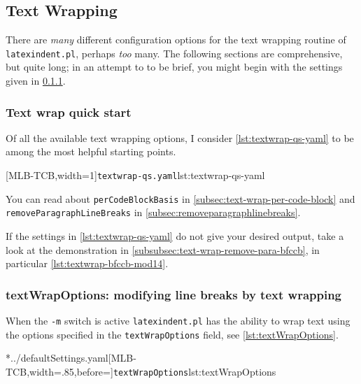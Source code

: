 \subsection{Text Wrapping}\label{subsec:textwrapping}
	There are \emph{many} different configuration options for the text wrapping routine of
	\texttt{latexindent.pl}, perhaps \emph{too} many. The following sections are
	comprehensive, but quite long; in an attempt to to be brief, you might begin with the
	settings given in \cref{subsec:textwrapping-quick-start}.

\subsubsection{Text wrap quick start}\label{subsec:textwrapping-quick-start}

	Of all the available text wrapping options, I consider \cref{lst:textwrap-qs-yaml} to be
	among the most helpful starting points.

	[MLB-TCB,width=1\linewidth]{\texttt{textwrap-qs.yaml}}{lst:textwrap-qs-yaml}


	You can read about \texttt{perCodeBlockBasis} in \cref{subsec:text-wrap-per-code-block}
	and \texttt{removeParagraphLineBreaks} in \cref{subsec:removeparagraphlinebreaks}.

	If the settings in \cref{lst:textwrap-qs-yaml} do not give your desired output, take a
	look at the demonstration in \cref{subsubsec:text-wrap-remove-para-bfccb}, in particular
	\cref{lst:textwrap-bfccb-mod14}.

\subsubsection{textWrapOptions: modifying line breaks by text wrapping}

	When the \texttt{-m} switch is active \texttt{latexindent.pl} has the ability to wrap
	text using the options%
	 specified in the \texttt{textWrapOptions} field,
	see \cref{lst:textWrapOptions}.


	\cmhlistingsfromfile[style=textWrapOptions]*{../defaultSettings.yaml}[MLB-TCB,width=.85\linewidth,before=\centering]{\texttt{textWrapOptions}}{lst:textWrapOptions}

